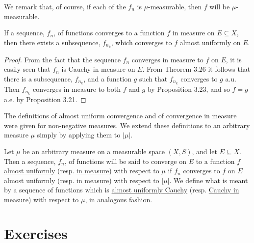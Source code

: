 We remark that, of course, if each of the $f_n$ is $\mu$-measurable, then $f$ will be $\mu$-measurable.

\begin{corollary}
If a sequence, $f_n$, of functions converges to a function $f$ in measure on $E \subseteq X$, then there exists a subsequence, $f_{n_k}$, which converges to $f$ almost uniformly on $E$.
\end{corollary}

\begin{proof}
From the fact that the sequence $f_n$ converges in measure to $f$ on $E$, it is easily seen that $f_n$ is Cauchy in measure on $E$. From Theorem 3.26 it follows that there is a subsequence, $f_{n_k}$, and a function $g$ such that $f_{n_k}$ converges to $g$ a.u. Then $f_{n_k}$ converges in measure to both $f$ and $g$ by Proposition 3.23, and so $f=g$ a.e. by Proposition 3.21.
\end{proof}

The definitions of almost uniform convergence and of convergence in measure were given for non-negative measures. We extend these definitions to an arbitrary measure $\mu$ simply by applying them to $|\mu|$.

\begin{definition}
Let $\mu$ be an arbitrary measure on a measurable space $(X, S)$, and let $E \subseteq X$. Then a sequence, $f_n$, of functions will be said to converge on $E$ to a function $f$ \underline{almost uniformly} (resp. \underline{in measure}) with respect to $\mu$ if $f_n$ converges to $f$ on $E$ almost uniformly (resp. in measure) with respect to $|\mu|$. We define what is meant by a sequence of functions which is \underline{almost uniformly Cauchy} (resp. \underline{Cauchy in measure}) with respect to $\mu$, in analogous fashion. 
\end{definition}

\section{Exercises}


